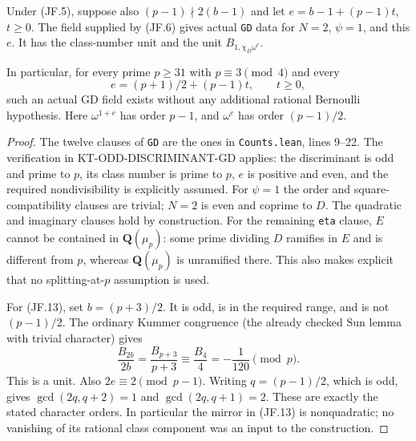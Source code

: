 \begin{corollary}
Under (JF.5), suppose also $(p-1)\nmid2(b-1)$ and let
$e=b-1+(p-1)t$, $t\geq0$.  The field supplied by (JF.6) gives
actual \texttt{GD} data for $N=2$, $\psi=1$, and this $e$.
It has the class-number unit and the unit
$B_{1,\chi_D\omega^e}$.

In particular, for every prime $p\geq31$ with $p\equiv3\pmod4$
and every
\[
                      e=(p+1)/2+(p-1)t,\qquad t\geq0,    \tag{JF.13}
\]
such an actual GD field exists without any additional rational
Bernoulli hypothesis.  Here $\omega^{1+e}$ has order $p-1$,
and $\omega^e$ has order $(p-1)/2$.
\end{corollary}
\begin{proof}
The twelve clauses of \texttt{GD} are the ones in
\texttt{Counts.lean}, lines 9--22.  The verification in
KT-ODD-DISCRIMINANT-GD applies: the discriminant is odd and
prime to $p$, its class number is prime to $p$, $e$ is positive
and even, and the required nondivisibility is explicitly assumed.
For $\psi=1$ the order and square-compatibility clauses are trivial;
$N=2$ is even and coprime to $D$.  The quadratic and imaginary
clauses hold by construction.  For the remaining \texttt{eta}
clause, $E$ cannot be contained in $\mathbf Q(\mu_p)$: some
prime dividing $D$ ramifies in $E$ and is different from $p$,
whereas $\mathbf Q(\mu_p)$ is unramified there.  This also makes
explicit that no splitting-at-$p$ assumption is used.

For (JF.13), set $b=(p+3)/2$.  It is odd, is in the required
range, and is not $(p-1)/2$.  The ordinary Kummer congruence
(the already checked Sun lemma with trivial character) gives
\[
 \frac{B_{2b}}{2b}=\frac{B_{p+3}}{p+3}
       \equiv\frac{B_4}{4}=-\frac1{120}\pmod p.          \tag{JF.14}
\]
This is a unit.  Also $2e\equiv2\pmod{p-1}$.
Writing $q=(p-1)/2$, which is odd, gives
$\gcd(2q,q+2)=1$ and $\gcd(2q,q+1)=2$.
These are exactly the stated character orders.  In particular
the mirror in (JF.13) is nonquadratic; no vanishing of its
rational class component was an input to the construction.
\end{proof}

